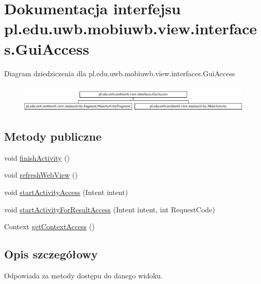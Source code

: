 \hypertarget{interfacepl_1_1edu_1_1uwb_1_1mobiuwb_1_1view_1_1interfaces_1_1_gui_access}{}\section{Dokumentacja interfejsu pl.\+edu.\+uwb.\+mobiuwb.\+view.\+interfaces.\+Gui\+Access}
\label{interfacepl_1_1edu_1_1uwb_1_1mobiuwb_1_1view_1_1interfaces_1_1_gui_access}
Diagram dziedziczenia dla pl.\+edu.\+uwb.\+mobiuwb.\+view.\+interfaces.\+Gui\+Access\begin{figure}[H]
\begin{center}
\leavevmode
\includegraphics[height=1.349398cm]{interfacepl_1_1edu_1_1uwb_1_1mobiuwb_1_1view_1_1interfaces_1_1_gui_access}
\end{center}
\end{figure}
\subsection*{Metody publiczne}
\begin{DoxyCompactItemize}
\item 
void \hyperlink{interfacepl_1_1edu_1_1uwb_1_1mobiuwb_1_1view_1_1interfaces_1_1_gui_access_a17aff21aa9cea753325ca4e64367bb42}{finish\+Activity} ()
\item 
void \hyperlink{interfacepl_1_1edu_1_1uwb_1_1mobiuwb_1_1view_1_1interfaces_1_1_gui_access_a4de9de4b2f2f9d959204044e3e502609}{refresh\+Web\+View} ()
\item 
void \hyperlink{interfacepl_1_1edu_1_1uwb_1_1mobiuwb_1_1view_1_1interfaces_1_1_gui_access_ac806d6218f919f70d7a632095dec0f0e}{start\+Activity\+Access} (Intent intent)
\item 
void \hyperlink{interfacepl_1_1edu_1_1uwb_1_1mobiuwb_1_1view_1_1interfaces_1_1_gui_access_a08f5b17735ecda9cbcd49a29b96511a5}{start\+Activity\+For\+Result\+Access} (Intent intent, int Request\+Code)
\item 
Context \hyperlink{interfacepl_1_1edu_1_1uwb_1_1mobiuwb_1_1view_1_1interfaces_1_1_gui_access_ad6d877aee89f7f7285885e0f74483da6}{get\+Context\+Access} ()
\end{DoxyCompactItemize}


\subsection{Opis szczegółowy}
Odpowiada za metody dostępu do danego widoku. 

